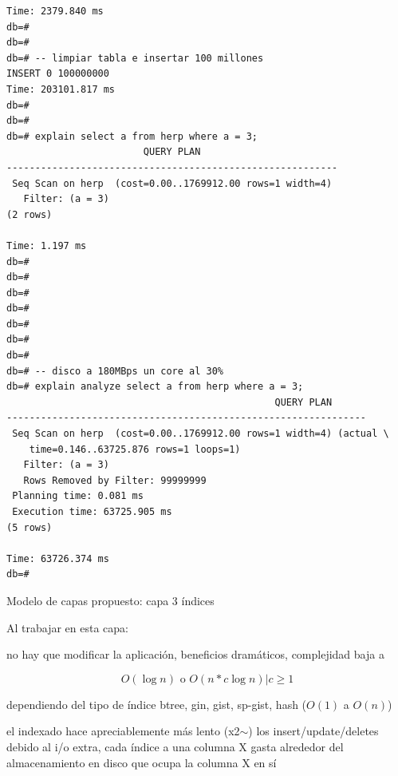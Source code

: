\documentclass[11pt,spanish]{article}
\newcommand{\rowsp}[1][1em]{\vspace{#1}}
\newcommand{\hone}[1]{{\rowsp[0.3em]\noindent\Large #1 \rowsp[0.3em]}}
\newcommand{\mydesc}[1]{%
	\begin{description}
	\setlength\itemsep{0em}%
	#1
	\end{description}
}
\newcommand{\pros}{\item[pros:]}
\newcommand{\cons}{\item[cons:]}
\begin{document}
\begin{lstlisting}
Time: 2379.840 ms
db=# 
db=# 
db=# -- limpiar tabla e insertar 100 millones
INSERT 0 100000000
Time: 203101.817 ms
db=# 
db=# 
db=# explain select a from herp where a = 3;
                        QUERY PLAN                        
----------------------------------------------------------
 Seq Scan on herp  (cost=0.00..1769912.00 rows=1 width=4)
   Filter: (a = 3)
(2 rows)

Time: 1.197 ms
db=#
db=#
db=#
db=#
db=#
db=#
db=#
db=# -- disco a 180MBps un core al 30%
db=# explain analyze select a from herp where a = 3;
                                               QUERY PLAN                                               
---------------------------------------------------------------
 Seq Scan on herp  (cost=0.00..1769912.00 rows=1 width=4) (actual \
	time=0.146..63725.876 rows=1 loops=1)
   Filter: (a = 3)
   Rows Removed by Filter: 99999999
 Planning time: 0.081 ms
 Execution time: 63725.905 ms
(5 rows)

Time: 63726.374 ms
db=# 
\end{lstlisting}

\newpage %
\hone{Modelo de capas propuesto: capa 3 índices}

Al trabajar en esta capa:
\mydesc{\pros no hay que modificar la aplicación, beneficios dramáticos, complejidad baja a 

	 \[O(\log n) \textrm{ o } O(n*c \log n) | c \ge 1\]

	dependiendo del tipo de índice  btree, gin, gist, sp-gist,
	hash ($O(1)$ a $O(n)$)
	
	\cons el indexado hace apreciablemente más lento (x2$\sim$) los
		insert/update/deletes debido al i/o extra, cada índice a una
		columna X gasta
		alrededor del almacenamiento en disco que ocupa la columna X en sí
		
}
\end{document}
